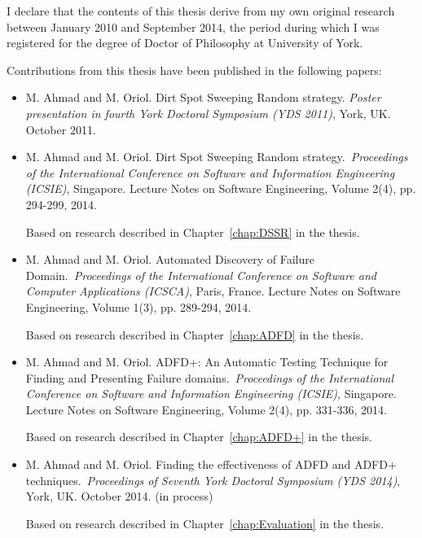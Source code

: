 \begin{declaration}

I declare that the contents of this thesis derive from my own original research between January 2010 and September 2014, the period during which I was registered for the degree of Doctor of Philosophy at University of York.

Contributions from this thesis have been published in the following papers: 

\begin{itemize}

\item M. Ahmad and M. Oriol. Dirt Spot Sweeping Random strategy. \textit{Poster presentation in fourth York Doctoral Symposium (YDS 2011)}, York, UK. October 2011.

\item M. Ahmad and M. Oriol. Dirt Spot Sweeping Random strategy.~\textit{Proceedings of the International Conference on Software and Information Engineering (ICSIE)}, Singapore. Lecture Notes on Software Engineering, Volume 2(4), pp. 294-299, 2014.

Based on research described in Chapter~\ref{chap:DSSR} in the thesis.\\

\item M. Ahmad and M. Oriol. Automated Discovery of Failure Domain.~\textit{Proceedings of the International Conference on Software and Computer Applications (ICSCA)}, Paris, France. Lecture Notes on Software Engineering, Volume 1(3), pp. 289-294, 2014.

Based on research described in Chapter~\ref{chap:ADFD} in the thesis.\\

\item M. Ahmad and M. Oriol. ADFD+: An Automatic Testing Technique for Finding and Presenting Failure domains.~\textit{Proceedings of the International Conference on Software and Information Engineering (ICSIE)}, Singapore. Lecture Notes on Software Engineering, Volume 2(4), pp. 331-336, 2014.

Based on research described in Chapter~\ref{chap:ADFD+} in the thesis.\\

\item M. Ahmad and M. Oriol. Finding the effectiveness of ADFD and ADFD+ techniques.~\textit{Proceedings of Seventh York Doctoral Symposium (YDS 2014)}, York, UK. October 2014. (in process)

Based on research described in Chapter~\ref{chap:Evaluation} in the thesis.

\end{itemize}

\end{declaration}